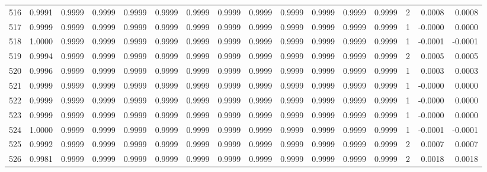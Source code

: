 \begin{tabular}{lrrrrrrrrrrrrrrr}
516 &      0.9991 &  0.9999 &  0.9999 &  0.9999 &  0.9999 &  0.9999 &  0.9999 &  0.9999 &  0.9999 &  0.9999 &   0.9999 &     0.9999 &      2 &                    0.0008 &                     0.0008 \\
517 &      0.9999 &  0.9999 &  0.9999 &  0.9999 &  0.9999 &  0.9999 &  0.9999 &  0.9999 &  0.9999 &  0.9999 &   0.9999 &     0.9999 &      1 &                   -0.0000 &                     0.0000 \\
518 &      1.0000 &  0.9999 &  0.9999 &  0.9999 &  0.9999 &  0.9999 &  0.9999 &  0.9999 &  0.9999 &  0.9999 &   0.9999 &     0.9999 &      1 &                   -0.0001 &                    -0.0001 \\
519 &      0.9994 &  0.9999 &  0.9999 &  0.9999 &  0.9999 &  0.9999 &  0.9999 &  0.9999 &  0.9999 &  0.9999 &   0.9999 &     0.9999 &      2 &                    0.0005 &                     0.0005 \\
520 &      0.9996 &  0.9999 &  0.9999 &  0.9999 &  0.9999 &  0.9999 &  0.9999 &  0.9999 &  0.9999 &  0.9999 &   0.9999 &     0.9999 &      1 &                    0.0003 &                     0.0003 \\
521 &      0.9999 &  0.9999 &  0.9999 &  0.9999 &  0.9999 &  0.9999 &  0.9999 &  0.9999 &  0.9999 &  0.9999 &   0.9999 &     0.9999 &      1 &                   -0.0000 &                     0.0000 \\
522 &      0.9999 &  0.9999 &  0.9999 &  0.9999 &  0.9999 &  0.9999 &  0.9999 &  0.9999 &  0.9999 &  0.9999 &   0.9999 &     0.9999 &      1 &                   -0.0000 &                     0.0000 \\
523 &      0.9999 &  0.9999 &  0.9999 &  0.9999 &  0.9999 &  0.9999 &  0.9999 &  0.9999 &  0.9999 &  0.9999 &   0.9999 &     0.9999 &      1 &                   -0.0000 &                     0.0000 \\
524 &      1.0000 &  0.9999 &  0.9999 &  0.9999 &  0.9999 &  0.9999 &  0.9999 &  0.9999 &  0.9999 &  0.9999 &   0.9999 &     0.9999 &      1 &                   -0.0001 &                    -0.0001 \\
525 &      0.9992 &  0.9999 &  0.9999 &  0.9999 &  0.9999 &  0.9999 &  0.9999 &  0.9999 &  0.9999 &  0.9999 &   0.9999 &     0.9999 &      2 &                    0.0007 &                     0.0007 \\
526 &      0.9981 &  0.9999 &  0.9999 &  0.9999 &  0.9999 &  0.9999 &  0.9999 &  0.9999 &  0.9999 &  0.9999 &   0.9999 &     0.9999 &      2 &                    0.0018 &                     0.0018 \\

\end{tabular}
